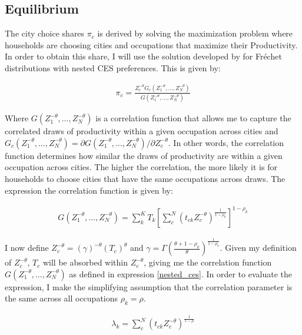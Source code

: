 \documentclass[10pt]{article}
\begin{document}
\subsection{Equilibrium}

The city choice shares $\pi_c$ is derived by solving the maximization problem where households are choosing cities and occupations that maximize their Productivity. In order to obtain this share, I will use the solution developed by \cite{lindandramondo} for Fr\'{e}chet distributions with nested CES preferences. This is given by:

\begin{align*}
    \pi_c = \frac{Z_c^{- \theta} G_c(Z_1^{- \theta}, \dots, Z_N^{- \theta})}{G(Z_1^{- \theta}, \dots, Z_N^{- \theta})}
\end{align*}

Where $G(Z_1^{- \theta}, \dots, Z_N^{- \theta})$ is a correlation function that allows me to capture the correlated draws of productivity within a given occupation across cities and $G_c (Z_1^{- \theta}, \dots, Z_N^{- \theta}) = \partial G(Z_1^{- \theta}, \dots, Z_N^{- \theta}) / \partial Z_c^{- \theta}$. In other words, the correlation function determines how similar the draws of productivity are within a given occupation across cities. The higher the correlation, the more likely it is for households to choose cities that have the same occupations across draws. The expression the correlation function is given by:

\begin{align}
    G(Z_1^{- \theta}, \dots, Z_N^{- \theta}) = \sum_{k}^{K} T_k \left[ \sum_{c}^{N} (t_{ck} Z_c^{- \theta})^{\frac{1}{1 - \rho_k}} \right]^{1 - \rho_k}
    \label{nested_ces}
\end{align}

I now define $Z_c^{- \theta} = (\gamma)^{- \theta} (T_c)^{\theta}$ and $\gamma = \Gamma (\frac{\theta + 1 - \rho_k}{\theta})^{\frac{1}{1 - \rho_k}}$. Given my definition of $Z_c^{- \theta}$, $T_c$ will be absorbed within $Z_c^{- \theta}$, giving me the correlation function $G(Z_1^{- \theta}, \dots, Z_N^{- \theta})$ as defined in expression \ref{nested_ces}. In order to evaluate the expression, I make the simplifying assumption that the correlation parameter is the same across all occupations $\rho_k = \rho$.

\begin{align*}
    \lambda_{k} = \sum_{c}^{N} \left( t_{ck} Z_{c}^{-\theta} \right)^{\frac{1}{1-\rho}}
\end{align*}
\end{document}

